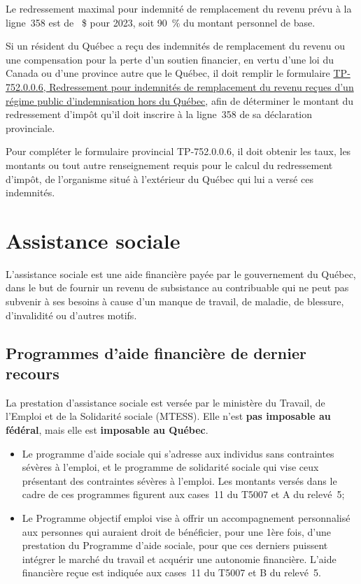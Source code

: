 Le redressement maximal pour indemnité de remplacement du revenu prévu à la ligne~358 est de ~\$ pour 2023, soit 90~\% du montant personnel de base.

Si un résident du Québec a reçu des indemnités de remplacement du revenu ou une compensation pour la perte d'un soutien financier, en vertu d'une loi du Canada ou d'une province autre que le Québec, il doit remplir le formulaire \href{https://www.revenuquebec.ca/fr/services-en-ligne/formulaires-et-publications/details-courant/tp-752-0-0-6/}{TP-752.0.0.6, Redressement pour indemnités de remplacement du revenu reçues d'un régime public d'indemnisation hors du Québec}, afin de déterminer le montant du redressement d'impôt qu'il doit inscrire à la ligne~358 de sa déclaration provinciale. 

Pour compléter le formulaire provincial TP-752.0.0.6, il doit obtenir les taux, les montants ou tout autre renseignement requis pour le calcul du redressement d'impôt, de l'organisme situé à l'extérieur du Québec qui lui a versé ces indemnités. 



\section{Assistance sociale}
\begin{intro}
	L'assistance sociale est une aide financière payée par le gouvernement du Québec, dans le but de fournir un revenu de subsistance au contribuable qui ne peut pas subvenir à ses besoins à cause d'un manque de travail, de maladie, de blessure, d'invalidité ou d'autres motifs.
\end{intro}


\subsection{Programmes d'aide financière de dernier recours}
La prestation d'assistance sociale est versée par le ministère du Travail, de l'Emploi et de la Solidarité sociale (MTESS). Elle n'est \textbf{pas imposable au fédéral}, mais elle est \textbf{imposable au Québec}.

\begin{itemize}
	\item Le \og programme d'aide sociale \fg{} qui s'adresse aux individus sans contraintes sévères à l'emploi, et le \og programme de solidarité sociale \fg{} qui vise ceux présentant des contraintes sévères à l'emploi. Les montants versés dans le cadre de ces programmes figurent aux cases~11 du T5007 et A du relevé~5;
	\item Le \og Programme objectif emploi \fg{} vise à offrir un accompagnement personnalisé aux personnes qui auraient droit de bénéficier, pour une 1ère fois, d'une prestation du Programme d'aide sociale, pour que ces derniers puissent intégrer le marché du travail et acquérir une autonomie financière. L'aide financière reçue est indiquée aux cases~11 du T5007 et B du relevé~5.
\end{itemize}

